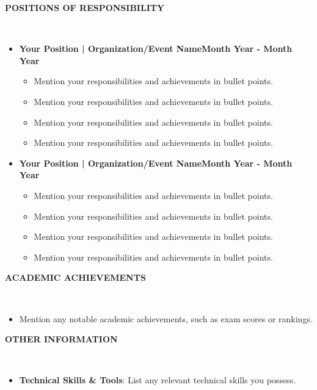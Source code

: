 \documentclass[11pt,article]{article}
\newcommand{\resheading}[1]{{\small \colorbox{mygrey} { \begin{minipage}{0.99\textwidth}{\textbf{#1 \vphantom{p\^{E}}}}\end{minipage}}}}
\begin{document}
\noindent
\resheading{\textbf{POSITIONS OF RESPONSIBILITY} }\\[-0.35cm]
\vspace{-0.4em}
\begin{itemize}
\setlength\itemsep{-0.28em}
\item \textbf{Your Position | Organization/Event Name}\hfill \textbf{Month Year - Month Year}
\vspace{-0.25em}
\begin{itemize}[noitemsep,topsep=0pt]
    \item Mention your responsibilities and achievements in bullet points.
    \item Mention your responsibilities and achievements in bullet points.
    \item Mention your responsibilities and achievements in bullet points.
    \item Mention your responsibilities and achievements in bullet points.
\end{itemize}
\vspace{0.5em}
\item \textbf{Your Position | Organization/Event Name}\hfill \textbf{Month Year - Month Year}
\vspace{-0.25em}
\begin{itemize}[noitemsep,topsep=0pt]
    \item Mention your responsibilities and achievements in bullet points.
    \item Mention your responsibilities and achievements in bullet points.
    \item Mention your responsibilities and achievements in bullet points.
    \item Mention your responsibilities and achievements in bullet points.
\end{itemize}
\vspace{0.5em}
\end{itemize}

\noindent
\resheading{\textbf{ACADEMIC ACHIEVEMENTS}}\\[-0.35cm]
\vspace{-0.4em}
\begin{itemize}[itemsep=1pt]
\item Mention any notable academic achievements, such as exam scores or rankings.
\end{itemize}

\noindent
\resheading{\textbf{OTHER INFORMATION}}\\[-0.35cm]
\begin{itemize}
  \item \textbf{Technical Skills \& Tools}: List any relevant technical skills you possess.
\end{itemize}
\end{document}

